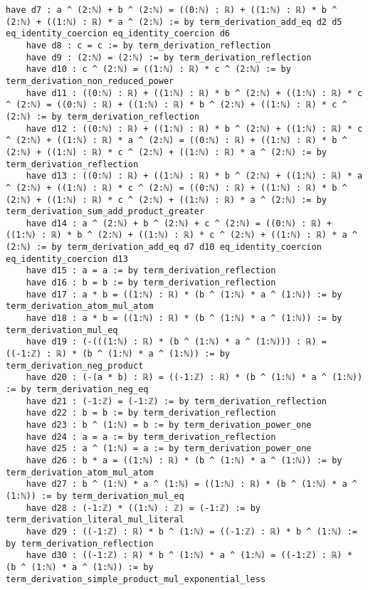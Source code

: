 \documentclass{article}
\begin{document}
\begin{tcolorbox}[colback=white!10, width=\linewidth]
\begin{lstlisting}[language=Lean4]
    have d7 : a ^ (2:ℕ) + b ^ (2:ℕ) = ((0:ℕ) : ℝ) + ((1:ℕ) : ℝ) * b ^ (2:ℕ) + ((1:ℕ) : ℝ) * a ^ (2:ℕ) := by term_derivation_add_eq d2 d5 eq_identity_coercion eq_identity_coercion d6
    have d8 : c = c := by term_derivation_reflection
    have d9 : (2:ℕ) = (2:ℕ) := by term_derivation_reflection
    have d10 : c ^ (2:ℕ) = ((1:ℕ) : ℝ) * c ^ (2:ℕ) := by term_derivation_non_reduced_power
    have d11 : ((0:ℕ) : ℝ) + ((1:ℕ) : ℝ) * b ^ (2:ℕ) + ((1:ℕ) : ℝ) * c ^ (2:ℕ) = ((0:ℕ) : ℝ) + ((1:ℕ) : ℝ) * b ^ (2:ℕ) + ((1:ℕ) : ℝ) * c ^ (2:ℕ) := by term_derivation_reflection
    have d12 : ((0:ℕ) : ℝ) + ((1:ℕ) : ℝ) * b ^ (2:ℕ) + ((1:ℕ) : ℝ) * c ^ (2:ℕ) + ((1:ℕ) : ℝ) * a ^ (2:ℕ) = ((0:ℕ) : ℝ) + ((1:ℕ) : ℝ) * b ^ (2:ℕ) + ((1:ℕ) : ℝ) * c ^ (2:ℕ) + ((1:ℕ) : ℝ) * a ^ (2:ℕ) := by term_derivation_reflection
    have d13 : ((0:ℕ) : ℝ) + ((1:ℕ) : ℝ) * b ^ (2:ℕ) + ((1:ℕ) : ℝ) * a ^ (2:ℕ) + ((1:ℕ) : ℝ) * c ^ (2:ℕ) = ((0:ℕ) : ℝ) + ((1:ℕ) : ℝ) * b ^ (2:ℕ) + ((1:ℕ) : ℝ) * c ^ (2:ℕ) + ((1:ℕ) : ℝ) * a ^ (2:ℕ) := by term_derivation_sum_add_product_greater
    have d14 : a ^ (2:ℕ) + b ^ (2:ℕ) + c ^ (2:ℕ) = ((0:ℕ) : ℝ) + ((1:ℕ) : ℝ) * b ^ (2:ℕ) + ((1:ℕ) : ℝ) * c ^ (2:ℕ) + ((1:ℕ) : ℝ) * a ^ (2:ℕ) := by term_derivation_add_eq d7 d10 eq_identity_coercion eq_identity_coercion d13
    have d15 : a = a := by term_derivation_reflection
    have d16 : b = b := by term_derivation_reflection
    have d17 : a * b = ((1:ℕ) : ℝ) * (b ^ (1:ℕ) * a ^ (1:ℕ)) := by term_derivation_atom_mul_atom
    have d18 : a * b = ((1:ℕ) : ℝ) * (b ^ (1:ℕ) * a ^ (1:ℕ)) := by term_derivation_mul_eq
    have d19 : (-(((1:ℕ) : ℝ) * (b ^ (1:ℕ) * a ^ (1:ℕ))) : ℝ) = ((-1:ℤ) : ℝ) * (b ^ (1:ℕ) * a ^ (1:ℕ)) := by term_derivation_neg_product
    have d20 : (-(a * b) : ℝ) = ((-1:ℤ) : ℝ) * (b ^ (1:ℕ) * a ^ (1:ℕ)) := by term_derivation_neg_eq
    have d21 : (-1:ℤ) = (-1:ℤ) := by term_derivation_reflection
    have d22 : b = b := by term_derivation_reflection
    have d23 : b ^ (1:ℕ) = b := by term_derivation_power_one
    have d24 : a = a := by term_derivation_reflection
    have d25 : a ^ (1:ℕ) = a := by term_derivation_power_one
    have d26 : b * a = ((1:ℕ) : ℝ) * (b ^ (1:ℕ) * a ^ (1:ℕ)) := by term_derivation_atom_mul_atom
    have d27 : b ^ (1:ℕ) * a ^ (1:ℕ) = ((1:ℕ) : ℝ) * (b ^ (1:ℕ) * a ^ (1:ℕ)) := by term_derivation_mul_eq
    have d28 : (-1:ℤ) * ((1:ℕ) : ℤ) = (-1:ℤ) := by term_derivation_literal_mul_literal
    have d29 : ((-1:ℤ) : ℝ) * b ^ (1:ℕ) = ((-1:ℤ) : ℝ) * b ^ (1:ℕ) := by term_derivation_reflection
    have d30 : ((-1:ℤ) : ℝ) * b ^ (1:ℕ) * a ^ (1:ℕ) = ((-1:ℤ) : ℝ) * (b ^ (1:ℕ) * a ^ (1:ℕ)) := by term_derivation_simple_product_mul_exponential_less

\end{lstlisting}
\end{tcolorbox}
\end{document}
